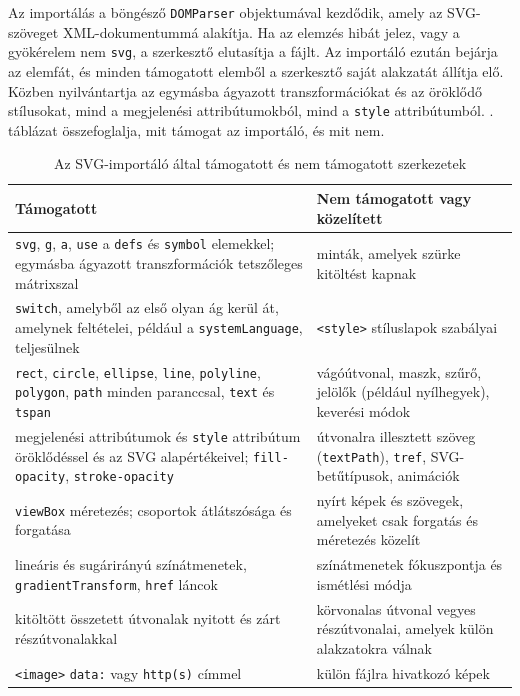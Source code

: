 Az importálás a böngésző \texttt{DOMParser} objektumával kezdődik, amely az SVG-szöveget XML-dokumentummá alakítja. Ha az elemzés hibát jelez, vagy a gyökérelem nem \texttt{svg}, a szerkesztő elutasítja a fájlt. Az importáló ezután bejárja az elemfát, és minden támogatott elemből a szerkesztő saját alakzatát állítja elő. Közben nyilvántartja az egymásba ágyazott transzformációkat és az öröklődő stílusokat, mind a megjelenési attribútumokból, mind a \texttt{style} attribútumból. . táblázat összefoglalja, mit támogat az importáló, és mit nem.

\begin{table}[!htbp]
\caption{Az SVG-importáló által támogatott és nem támogatott szerkezetek}
\label{tab:import}
\centering
\footnotesize
\begin{tabular}{|>{\raggedright\arraybackslash}p{}|>{\raggedright\arraybackslash}p{}|}
\hline
\textbf{Támogatott} & \textbf{Nem támogatott vagy közelített} \\ \hline
\texttt{svg}, \texttt{g}, \texttt{a}, \texttt{use} a \texttt{defs} és \texttt{symbol} elemekkel; egymásba ágyazott transzformációk tetszőleges mátrixszal &
minták, amelyek szürke kitöltést kapnak \\ \hline
\texttt{switch}, amelyből az első olyan ág kerül át, amelynek feltételei, például a \texttt{systemLanguage}, teljesülnek &
\texttt{<style>} stíluslapok szabályai \\ \hline
\texttt{rect}, \texttt{circle}, \texttt{ellipse}, \texttt{line}, \texttt{polyline}, \texttt{polygon}, \texttt{path} minden paranccsal, \texttt{text} és \texttt{tspan} &
vágóútvonal, maszk, szűrő, jelölők (például nyílhegyek), keverési módok \\ \hline
megjelenési attribútumok és \texttt{style} attribútum öröklődéssel és az SVG alapértékeivel; \texttt{fill-opacity}, \texttt{stroke-opacity} &
útvonalra illesztett szöveg (\texttt{textPath}), \texttt{tref}, SVG-betűtípusok, animációk \\ \hline
\texttt{viewBox} méretezés; csoportok átlátszósága és forgatása &
nyírt képek és szövegek, amelyeket csak forgatás és méretezés közelít \\ \hline
lineáris és sugárirányú színátmenetek, \texttt{gradientTransform}, \texttt{href} láncok &
színátmenetek fókuszpontja és ismétlési módja \\ \hline
kitöltött összetett útvonalak nyitott és zárt részútvonalakkal &
körvonalas útvonal vegyes részútvonalai, amelyek külön alakzatokra válnak \\ \hline
\texttt{<image>} \texttt{data:} vagy \texttt{http(s)} címmel &
külön fájlra hivatkozó képek \\ \hline
\end{tabular}
\end{table}

